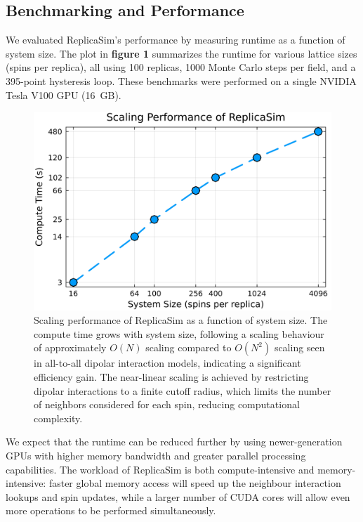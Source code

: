 \documentclass[journal=nalefd,manuscript=letter]{achemso}
\begin{document}
\subsection{Benchmarking and Performance}
We evaluated ReplicaSim’s performance by measuring runtime as a function of system size. The plot in \textbf{figure 1} summarizes the runtime for various lattice sizes (spins per replica), all using 100 replicas, 1000 Monte Carlo steps per field, and a 395-point hysteresis loop. These benchmarks were performed on a single NVIDIA Tesla V100 GPU (16 GB).
\begin{figure}[b!]

        \includegraphics[width=0.95\linewidth]{figures/performance_and_scaling.png}

\caption{Scaling performance of ReplicaSim as a function of system size. The compute time grows with system size, following a scaling behaviour of approximately $O(N)$ scaling compared to $O(N^{2})$ scaling seen in all-to-all dipolar interaction models, indicating a significant efficiency gain. The near-linear scaling is achieved by restricting dipolar interactions to a finite cutoff radius, which limits the number of neighbors considered for each spin, reducing computational complexity.}
 
\end{figure}

We expect that the runtime can be reduced further by using newer-generation GPUs with higher memory bandwidth and greater parallel processing capabilities. The workload of ReplicaSim is both compute-intensive and memory-intensive: faster global memory access will speed up the neighbour interaction lookups and spin updates, while a larger number of CUDA cores will allow even more operations to be performed simultaneously.
\end{document}
